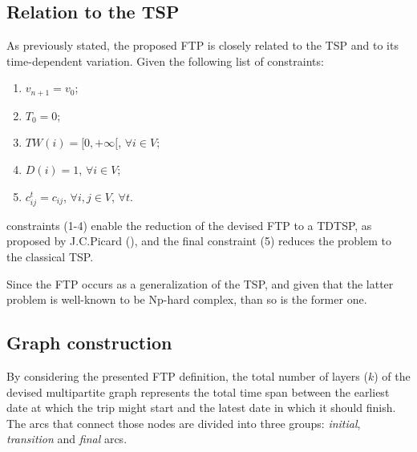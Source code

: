 \subsection{Relation to the TSP}

As previously stated, the proposed FTP is closely related to the TSP and to its
time-dependent variation. Given the following list of constraints:


\begin{enumerate}
      \item $v_{n+1} = v_0$;
      \item $T_0 = 0$;
      \item $TW(i) = [0, +\infty[$, $\forall i \in V$;
      \item $D(i) = 1$, $\forall i \in V$;
    \item $c_{ij}^{t} = c_{ij}$, $\forall i, j \in V$, $\forall t$.
\end{enumerate}
constraints (1-4) enable the reduction of the devised FTP to a TDTSP, as
proposed by J.C.Picard (\cite{tdtsp_picard}), and the final constraint (5)
reduces the problem to the classical TSP.

Since the FTP occurs as a generalization of the TSP, and given that the latter
problem is well-known to be Np-hard complex, than so is the former one.



\subsection{Graph construction}
\label{sec:graph}

By considering the presented FTP definition, the total number of layers ($k$) of
the devised multipartite graph represents the total time span between the
earliest date at which the trip might start and the latest date in which it
should finish. The arcs that connect those nodes are divided into three groups:
\textit{initial}, \textit{transition} and \textit{final} arcs.

